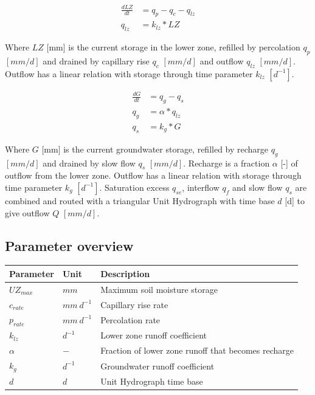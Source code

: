 \begin{align}
	\frac{dLZ}{dt} &= q_p - q_c - q_{lz}\\
	q_{lz} &= k_{lz}*LZ 
\end{align}

Where $LZ$ [mm] is the current storage in the lower zone, refilled by percolation $q_p$ $[mm/d]$ and drained by capillary rise $q_c$ $[mm/d]$ and outflow $q_{lz}$ $[mm/d]$.
Outflow has a linear relation with storage through time parameter $k_{lz}$ $[d^{-1}]$.

\begin{align}
	\frac{dG}{dt} &= q_g-q_s\\
	q_g &= \alpha*q_{lz} \\
	q_s &= k_g*G
\end{align}
  
Where $G$ [mm] is the current groundwater storage, refilled by recharge $q_g$ $[mm/d]$ and drained by slow flow $q_s$ $[mm/d]$.
Recharge is a fraction $\alpha$ [-] of outflow from the lower zone.
Outflow has a linear relation with storage through time parameter $k_{g}$ $[d^{-1}]$.
Saturation excess $q_{se}$, interflow $q_f$ and slow flow $q_s$ are combined and routed with a triangular Unit Hydrograph with time base $d$ [d] to give outflow $Q$ $[mm/d]$.

\subsection*{Parameter overview}
\begin{table}[htbp]
  \centering

    \begin{tabular}{lll}
    \toprule
    Parameter & Unit  & Description \\
    \midrule
    $UZ_{max}$ & $mm$    & Maximum soil moisture storage \\
    $c_{rate}$ & $mm~d^{-1}$ & Capillary rise rate \\
    $p_{rate}$ & $mm~d^{-1}$ & Percolation rate \\
    $k_{lz}$ & $d^{-1}$ & Lower zone runoff coefficient \\
    $\alpha$ & $-$     & Fraction of lower zone runoff that becomes recharge \\
    $k_g$   & $d^{-1}$ & Groundwater runoff coefficient \\
    $d$     & $d$     & Unit Hydrograph time base \\
    \bottomrule
    \end{tabular}%
  \label{tab:addlabel}%
\end{table}%


